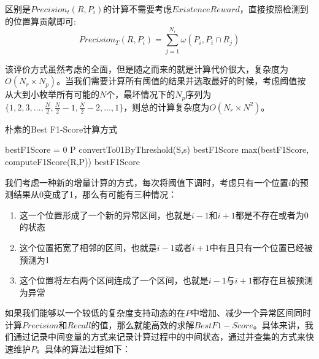 区别是$Precision_t(R,P_i)$的计算不需要考虑$ExistenceReward$，直接按照检测到的位置算贡献即可:
\begin{equation*}
Precision_T(R,P_i) = \sum_{j=1}^{N_r}\omega(P_i,P_i\cap R_j)
\end{equation*}

  该评价方式虽然考虑的全面，但是随之而来的就是计算代价很大，复杂度为$O(N_r\times N_p)$。当我们需要计算所有阈值的结果并选取最好的时候，考虑阈值按从大到小枚举所有可能的$N$个，最坏情况下的$N_p$序列为$\{1,2,3,\dots,\frac{N}{2},\frac{N}{2}-1,\frac{N}{2}-2,\dots,1\}$，则总的计算复杂度为$O(N_r\times N^2)$。

  \begin{algorithm}
  \caption{朴素的Best F1-Score计算方式}
  \begin{algorithmic}[1]
    \State bestF1Score = 0
    \State P \gets convertTo01ByThreshold(S,s)
    \State bestF1Score \gets max(bestF1Score, computeF1Score(R,P))
    \EndFor
    \State \Return bestF1Score
    \EndFunction
  \end{algorithmic}
  \end{algorithm}


  我们考虑一种新的增量计算的方式，每次将阈值下调时，考虑只有一个位置$i$的预测结果从0变成了1，那么有可能有三种情况：
  \begin{enumerate}
    \item 这一个位置形成了一个新的异常区间，也就是$i-1$和$i+1$都是不存在或者为0的状态
    \item 这个位置拓宽了相邻的区间，也就是$i-1$或者$i+1$中有且只有一个位置已经被预测为1
    \item 这个位置将左右两个区间连成了一个区间，也就是$i-1$与$i+1$都存在且被预测为异常
  \end{enumerate}

  如果我们能够以一个较低的复杂度支持动态的在$P$中增加、减少一个异常区间同时计算$Precision$和$Recall$的值，那么就能高效的求解$Best F1-Score$。具体来讲，我们通过记录中间变量的方式来记录计算过程中的中间状态，通过并查集的方式来快速维护$P$。具体的算法过程如下：

